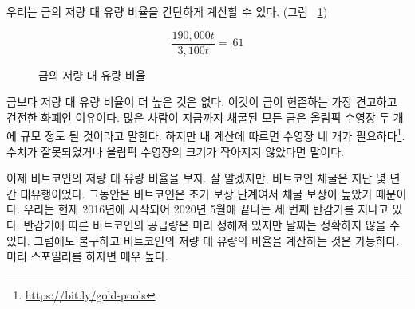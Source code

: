 \begin{comment}	
Using these numbers, we can easily calculate the stock-to-flow ratio for
gold (see Figure~\ref{fig:stock-to-flow-gold}).
\end{comment}
우리는 금의 저량 대 유량 비율을 간단하게 계산할 수 있다. (그림 ~\ref{fig:stock-to-flow-gold})

\begin{figure}
  \centering
  \begin{equation}
  \frac{190,000 t}{3,100 t} = ~ 61
  \end{equation}
  \caption{금의 저량 대 유량 비율}
  \label{fig:stock-to-flow-gold}
\end{figure}

\begin{comment}	
Nothing has a higher stock-to-flow ratio than gold. This is why gold, up to now,
was the hardest, soundest money in existence. It is often said that all the gold
mined so far would fit in two olympic-sized swimming pools. According to my
calculations\footnote{\url{https://bit.ly/gold-pools}}, we would need four. So
maybe this needs updating, or Olympic-sized swimming pools got smaller.
\end{comment}
금보다 저량 대 유량 비율이 더 높은 것은 없다. 
이것이 금이 현존하는 가장 견고하고 건전한 화폐인 이유이다. 
많은 사람이 지금까지 채굴된 모든 금은 올림픽 수영장 두 개에 규모 정도 될 것이라고 말한다.
하지만 내 계산에 따르면 수영장 네 개가 필요하다\footnote{\url{https://bit.ly/gold-pools}}. 
수치가 잘못되었거나 올림픽 수영장의 크기가 작아지지 않았다면 말이다.

\begin{comment}	
Enter Bitcoin. As you probably know, bitcoin mining was all the rage in
the last couple of years. This is because we are still in the early
phases of what is called the \textit{reward era}, where mining nodes are
rewarded with \textit{a lot} of bitcoin for their computational effort. We are
currently in reward era number 3, which began in 2016 and will end in
early 2020, probably in May. While the bitcoin supply is predetermined,
the inner workings of Bitcoin only allow for approximate dates.
Nevertheless, we can predict with certainty how high Bitcoin's
stock-to-flow ratio will be. Spoiler alert: it will be high.
\end{comment}
이제 비트코인의 저량 대 유량 비율을 보자. 
잘 알겠지만, 비트코인 채굴은 지난 몇 년간 대유행이었다.
그동안은 비트코인은 초기 보상 단계여서 채굴 보상이 높았기 때문이다.
우리는 현재 2016년에 시작되어 2020년 5월에 끝나는 세 번째 반감기를 지나고 있다.
반감기에 따른 비트코인의 공급량은 미리 정해져 있지만 날짜는 정확하지 않을 수 있다.
그럼에도 불구하고 비트코인의 저량 대 유량의 비율을 계산하는 것은 가능하다.
미리 스포일러를 하자면 매우 높다.


